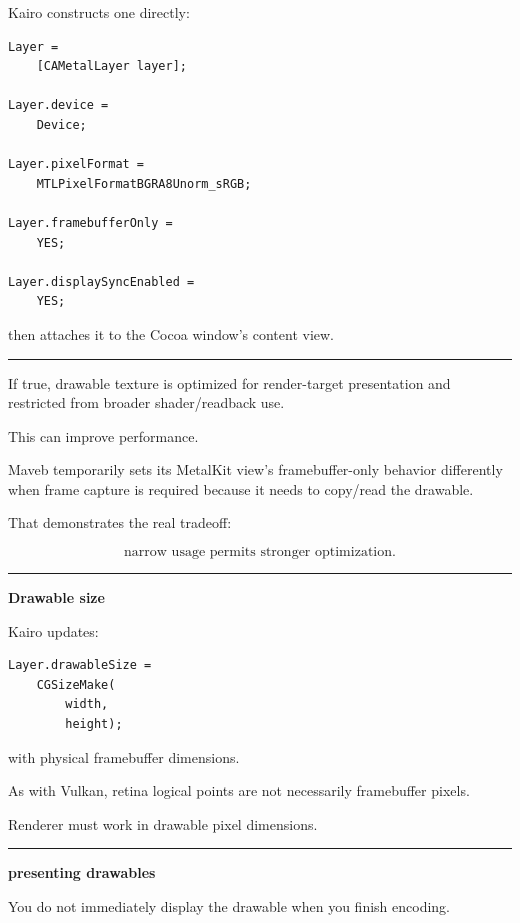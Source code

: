 Kairo constructs one directly:

\begin{verbatim}
Layer =
    [CAMetalLayer layer];

Layer.device =
    Device;

Layer.pixelFormat =
    MTLPixelFormatBGRA8Unorm_sRGB;

Layer.framebufferOnly =
    YES;

Layer.displaySyncEnabled =
    YES;
\end{verbatim}

then attaches it to the Cocoa window's content view.

\begin{center}\rule{0.5\linewidth}{0.5pt}\end{center}

\textbf{}

If true, drawable texture is optimized for render-target presentation and restricted from broader shader/readback use.

This can improve performance.

Maveb temporarily sets its MetalKit view's framebuffer-only behavior differently when frame capture is required because it needs to copy/read the drawable.

That demonstrates the real tradeoff:

\[
\boxed{
\text{narrow usage permits stronger optimization}.
}
\]

\begin{center}\rule{0.5\linewidth}{0.5pt}\end{center}

\textbf{Drawable size}

Kairo updates:

\begin{verbatim}
Layer.drawableSize =
    CGSizeMake(
        width,
        height);
\end{verbatim}

with physical framebuffer dimensions.

As with Vulkan, retina logical points are not necessarily framebuffer pixels.

Renderer must work in drawable pixel dimensions.

\begin{center}\rule{0.5\linewidth}{0.5pt}\end{center}

\textbf{presenting drawables}

You do not immediately display the drawable when you finish encoding.

